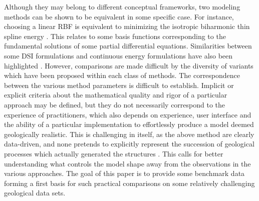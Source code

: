 \documentclass[final]{ring20}
\begin{document}
{Although they may belong to different conceptual frameworks, two modeling methods can be shown to be equivalent in some specific case. For instance, choosing a linear RBF is equivalent to minimizing the isotropic biharmonic thin spline energy \citep{Carr2001}. This relates to some basis functions corresponding to the fundamental solutions of some partial differential equations. Similarities between some DSI formulations and continuous energy formulations have also been highlighted \citep{Renaudeau2019MG}. However, comparisons are made difficult by the diversity of variants which have been proposed within each class of methods. The correspondence between the various method parameters is difficult to establish. Implicit or explicit criteria about the mathematical quality and rigor of a particular approach may be defined, but they do not necessarily correspond to the experience of practitioners, which also depends on experience, user interface and the ability of a particular implementation to effortlessly produce a model deemed geologically realistic. This is challenging in itself, as the above method are clearly data-driven, and none pretends to explicitly represent the succession of geological processes which actually generated the structures \citep{Caumon2010MG,Jessell2010T}. This calls for better understanding what controls the model shape away from the observations in the various approaches. The goal of this paper is to provide some benchmark data forming a first basis for such practical comparisons on some relatively challenging geological data sets. 


}
\end{document}
